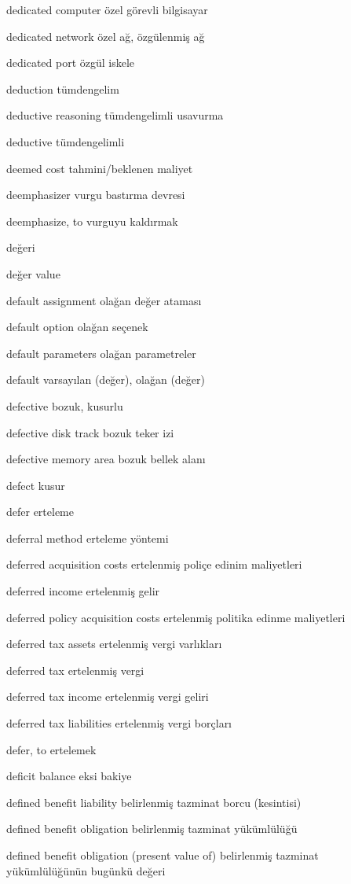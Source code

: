 \documentclass[12pt,fleqn]{article}\usepackage{../../common}
\begin{document}
dedicated computer özel görevli bilgisayar

dedicated network özel ağ, özgülenmiş ağ

dedicated port özgül iskele

deduction tümdengelim

deductive reasoning tümdengelimli usavurma

deductive tümdengelimli

deemed cost tahmini/beklenen maliyet

deemphasizer vurgu bastırma devresi

deemphasize, to vurguyu kaldırmak

değeri

değer value

default assignment olağan değer ataması

default option olağan seçenek

default parameters olağan parametreler

default varsayılan (değer), olağan (değer)

defective bozuk, kusurlu

defective disk track bozuk teker izi

defective memory area bozuk bellek alanı

defect kusur

defer erteleme

deferral method erteleme yöntemi

deferred acquisition costs ertelenmiş poliçe edinim maliyetleri

deferred income ertelenmiş gelir

deferred policy acquisition costs ertelenmiş politika edinme maliyetleri

deferred tax assets ertelenmiş vergi varlıkları

deferred tax ertelenmiş vergi

deferred tax income ertelenmiş vergi geliri

deferred tax liabilities ertelenmiş vergi borçları

defer, to ertelemek

deficit balance eksi bakiye

defined benefit liability belirlenmiş tazminat borcu (kesintisi)

defined benefit obligation belirlenmiş tazminat yükümlülüğü

defined benefit obligation (present value of) belirlenmiş tazminat yükümlülüğünün bugünkü değeri
\end{document}
